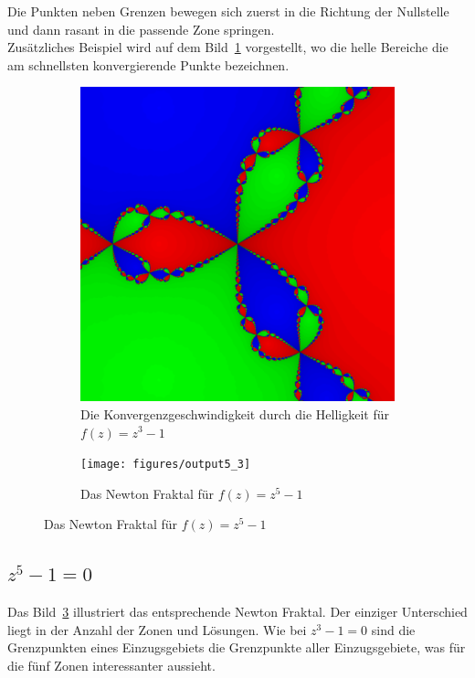 \documentclass[a4paper,12pt]{llncs}
\numberwithin{equation}{section}
\begin{document}
Die Punkten neben Grenzen bewegen sich zuerst in die Richtung der Nullstelle und dann rasant in die passende Zone springen.\\
Zusätzliches Beispiel wird auf dem Bild~\ref{fig:output3_3} vorgestellt, wo die helle Bereiche die am schnellsten konvergierende Punkte bezeichnen.
\begin{figure}[ht]   
	\begin{subfigure}{.5\textwidth}
	\centering
		\includegraphics[width=.7\linewidth]{figures/output3_3}
		\captionsetup{width=0.8\textwidth}
		\caption{Die Konvergenzgeschwindigkeit durch die Helligkeit für $f(z)=z^3-1$ }
		\label{fig:output3_3}
	\end{subfigure}%
	\begin{subfigure}{.5\textwidth}
	\centering
		\texttt{[image: figures/output5\_3]}
		\captionsetup{width=0.8\textwidth}
		\caption{Das Newton Fraktal für $f(z)=z^5-1$ }
		\label{fig:output5_3}
	\end{subfigure}%
\end{figure}

\subsection{$z^5 -1 = 0$}
Das Bild~\ref{fig:output5_3} illustriert das entsprechende Newton Fraktal. 
Der einziger Unterschied liegt in der Anzahl der Zonen und Lösungen.
Wie bei $z^3 -1 = 0$ sind die Grenzpunkten eines Einzugsgebiets die Grenzpunkte aller Einzugsgebiete, was für die fünf Zonen interessanter aussieht.
\end{document}
